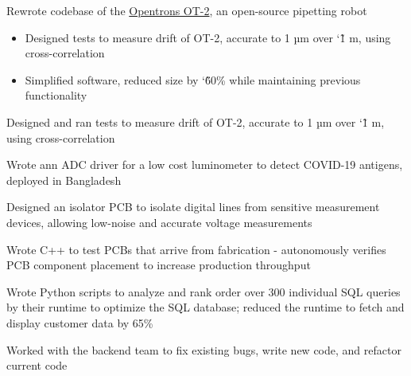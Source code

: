 \documentclass[]{deedy-resume-openfont}
\begin{document}
\begin{tightemize}
\item Rewrote codebase of the \href{https://opentrons.com/ot-2/}{Opentrons OT-2}, an open-source pipetting robot
  \begin{itemize}
    \item Designed tests to measure drift of OT-2, accurate to 1 µm over \char`\~ 1 m, using cross-correlation
    \item Simplified software, reduced size by \char`\~ 60\% while maintaining previous functionality
  \end{itemize}
\item Designed and ran tests to measure drift of OT-2, accurate to 1 µm over \char`\~ 1 m, using cross-correlation
\item Wrote ann ADC driver for a low cost luminometer to detect COVID-19 antigens, deployed in Bangladesh
\end{tightemize}

\vspace{8pt}

\begin{tightemize}
\item Designed an isolator PCB to isolate digital lines from sensitive measurement devices, allowing low-noise and accurate voltage measurements
\item Wrote C++ to test PCBs that arrive from fabrication - autonomously verifies PCB component placement to increase production throughput
\end{tightemize}

\vspace{8pt}


\begin{tightemize}
\item Wrote Python scripts to analyze and rank order over 300 individual SQL queries by their runtime to optimize the SQL database; reduced the runtime to fetch and display customer data by 65\%
\item Worked with the backend team to fix existing bugs, write new code, and refactor current code
\end{tightemize}

\vspace{12pt}
\end{document}
